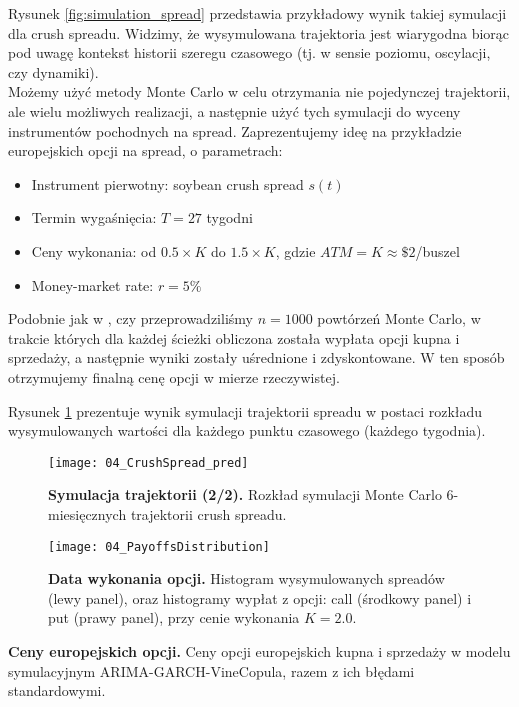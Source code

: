 Rysunek \ref{fig:simulation_spread} przedstawia przykładowy wynik takiej symulacji dla crush spreadu. Widzimy, że wysymulowana trajektoria jest wiarygodna biorąc pod uwagę kontekst historii szeregu czasowego (tj. w sensie poziomu, oscylacji, czy dynamiki).\\

Możemy użyć metody Monte Carlo w celu otrzymania nie pojedynczej trajektorii, ale wielu możliwych realizacji, a następnie użyć tych symulacji do wyceny instrumentów pochodnych na spread. Zaprezentujemy ideę na przykładzie europejskich opcji na spread, o parametrach:
\begin{itemize}
	\item Instrument pierwotny: soybean crush spread $s(t)$
	\item Termin wygaśnięcia: $T = 27$ tygodni
	\item Ceny wykonania: od $0.5\times K$ do $1.5\times K$, gdzie $ATM = K \approx\$2$/buszel
	\item Money-market rate: $r = 5\%$
\end{itemize}

Podobnie jak w \cite{Bernard_Pricing_Multivariate_Options_with_copulae}, czy  \cite{Herath_Copula_Crack_Spread} przeprowadziliśmy $n = 1000$ powtórzeń Monte Carlo, w trakcie których dla każdej ścieżki obliczona została wypłata opcji kupna i sprzedaży, a następnie wyniki zostały uśrednione i zdyskontowane. W ten sposób otrzymujemy finalną cenę opcji w mierze rzeczywistej.
 
Rysunek \ref{fig:simulation_monte_carlo} prezentuje wynik symulacji trajektorii spreadu w postaci rozkładu wysymulowanych wartości dla każdego punktu czasowego (każdego tygodnia).
\begin{figure}[h]
	\centering
	\texttt{[image: 04\_CrushSpread\_pred]}
	\caption{\textbf{Symulacja trajektorii (2/2).} Rozkład symulacji Monte Carlo $6$-miesięcznych trajektorii crush spreadu. \label{fig:simulation_monte_carlo}}
\end{figure}


\begin{figure}[h]
	\centering
	\texttt{[image: 04\_PayoffsDistribution]}
	\caption{\textbf{Data wykonania opcji.} Histogram wysymulowanych spreadów (lewy panel), oraz histogramy wypłat z opcji: call (środkowy panel) i put (prawy panel), przy cenie wykonania $K=2.0$. \label{fig:payoffs_distribution}}
\end{figure}


\begin{table}
	\centering
	
	\caption{\textbf{Ceny europejskich opcji.} Ceny opcji europejskich kupna i sprzedaży w modelu symulacyjnym ARIMA-GARCH-VineCopula, razem z ich błędami standardowymi. \label{tab:option_prices}}
\end{table}